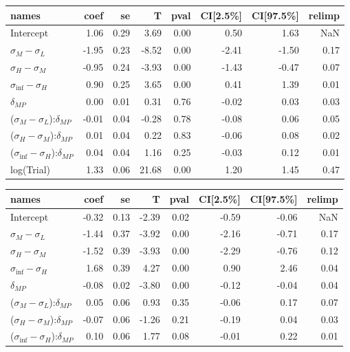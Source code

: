 

\begin{tabular}{lrrrrrrr}
\toprule
                                       names &  coef &   se &     T &  pval &  CI[2.5\%] &  CI[97.5\%] &  relimp \\
\midrule
                                   Intercept &  1.06 & 0.29 &  3.69 &  0.00 &       0.50 &        1.63 &     NaN \\
                   $\sigma_{M} - \sigma_{L}$ & -1.95 & 0.23 & -8.52 &  0.00 &      -2.41 &       -1.50 &    0.17 \\
                   $\sigma_{H} - \sigma_{M}$ & -0.95 & 0.24 & -3.93 &  0.00 &      -1.43 &       -0.47 &    0.07 \\
                $\sigma_{\inf} - \sigma_{H}$ &  0.90 & 0.25 &  3.65 &  0.00 &       0.41 &        1.39 &    0.01 \\
                               $\delta_{MP}$ &  0.00 & 0.01 &  0.31 &  0.76 &      -0.02 &        0.03 &    0.03 \\
   ($\sigma_{M} - \sigma_{L}$):$\delta_{MP}$ & -0.01 & 0.04 & -0.28 &  0.78 &      -0.08 &        0.06 &    0.05 \\
   ($\sigma_{H} - \sigma_{M}$):$\delta_{MP}$ &  0.01 & 0.04 &  0.22 &  0.83 &      -0.06 &        0.08 &    0.02 \\
($\sigma_{\inf} - \sigma_{H}$):$\delta_{MP}$ &  0.04 & 0.04 &  1.16 &  0.25 &      -0.03 &        0.12 &    0.01 \\
                                  log(Trial) &  1.33 & 0.06 & 21.68 &  0.00 &       1.20 &        1.45 &    0.47 \\
\bottomrule
\end{tabular}


\begin{tabular}{lrrrrrrr}
\toprule
                                       names &  coef &   se &     T &  pval &  CI[2.5\%] &  CI[97.5\%] &  relimp \\
\midrule
                                   Intercept & -0.32 & 0.13 & -2.39 &  0.02 &      -0.59 &       -0.06 &     NaN \\
                   $\sigma_{M} - \sigma_{L}$ & -1.44 & 0.37 & -3.92 &  0.00 &      -2.16 &       -0.71 &    0.17 \\
                   $\sigma_{H} - \sigma_{M}$ & -1.52 & 0.39 & -3.93 &  0.00 &      -2.29 &       -0.76 &    0.12 \\
                $\sigma_{\inf} - \sigma_{H}$ &  1.68 & 0.39 &  4.27 &  0.00 &       0.90 &        2.46 &    0.04 \\
                               $\delta_{MP}$ & -0.08 & 0.02 & -3.80 &  0.00 &      -0.12 &       -0.04 &    0.04 \\
   ($\sigma_{M} - \sigma_{L}$):$\delta_{MP}$ &  0.05 & 0.06 &  0.93 &  0.35 &      -0.06 &        0.17 &    0.07 \\
   ($\sigma_{H} - \sigma_{M}$):$\delta_{MP}$ & -0.07 & 0.06 & -1.26 &  0.21 &      -0.19 &        0.04 &    0.03 \\
($\sigma_{\inf} - \sigma_{H}$):$\delta_{MP}$ &  0.10 & 0.06 &  1.77 &  0.08 &      -0.01 &        0.22 &    0.01 \\
\bottomrule
\end{tabular}


